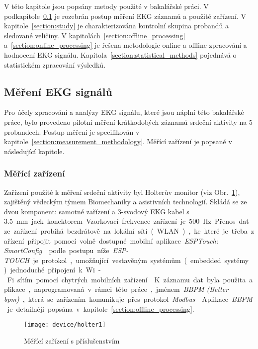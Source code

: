 V této kapitole jsou popsány metody použité v bakalářské práci. V
podkapitole~\ref{section:measurement} je rozebrán postup měření EKG záznamů a
použité zařízení. V kapitole~\ref{section:study} je charakterizována kontrolní
skupina probandů a sledované veličiny. V
kapitolách~\ref{section:offline_processing} a~\ref{section:online_processing} je
řešena metodologie online a offline zpracování a hodnocení EKG signálu.
Kapitola~\ref{section:statistical_methods} pojednává o statistickém zpracování
výsledků.

\subsection{Měření EKG signálů}
\label{section:measurement}
Pro účely zpracování a analýzy EKG signálu, které jsou náplní této bakalářské
práce, bylo provedeno pilotní měření krátkodobých záznamů srdeční aktivity na 5
probandech. Postup měření je specifikován v
kapitole~\ref{section:measurement_methodology}. Měřící zařízení je popsané v
následující kapitole.

\subsubsection{Měřící zařízení}
\label{section:measurement_device}
Zařízení použité k měření srdeční aktivity byl Holterův monitor (viz
Obr.~\ref{fig:device}), zajištěný vědeckým týmem Biomechaniky a asistivních
technologií. Skládá se ze dvou komponent: samotné zařízení a 3-svodový EKG kabel
s 3.5~\si\mm~jack konektorem. Vzorkovací frekvence zařízení je 500~\si\Hz.

Přenos dat ze zařízení probíhá bezdrátově na lokální sítí (WLAN), ke které je
třeba zařízení připojit pomocí volně dostupné mobilní aplikace \textit{ESPTouch:
SmartConfig}~\cite{ESPAPP} podle postupu níže. \textit{ESP-TOUCH} je protokol, umožňující
vestavěným systémům (embedded systémy) jednoduché připojení k Wi-Fi sítím pomocí
chytrých mobilních zařízení~\cite{esptouch}. K záznamu dat byla použita
aplikace, naprogramovaná v rámci této práce, jménem \textit{BBPM (Better bpm)},
která se zařízením komunikuje přes protokol \textit{Modbus}~\cite{modbus}.
Aplikace \textit{BBPM} je detailněji popsána v
kapitole~\ref{section:offline_processing}.

\begin{figure}[H]
    \begin{center}
        \texttt{[image: device/holter1]}
        \caption{Měřící zařízení s příslušenstvím}
        \label{fig:device}
    \end{center}
\end{figure}

